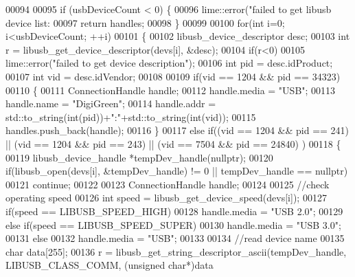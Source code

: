 \begin{DoxyCode}
{{00094 
00095     \textcolor{keywordflow}{if} (usbDeviceCount < 0) \{
00096         lime::error(\textcolor{stringliteral}{"failed to get libusb device list: %
00097         \textcolor{keywordflow}{return} handles;
00098     \}
00099 
00100     \textcolor{keywordflow}{for}(\textcolor{keywordtype}{int} i=0; i<usbDeviceCount; ++i)
00101     \{
00102         libusb\_device\_descriptor desc;
00103         \textcolor{keywordtype}{int} r = libusb\_get\_device\_descriptor(devs[i], &desc);
00104         \textcolor{keywordflow}{if}(r<0)
00105             lime::error(\textcolor{stringliteral}{"failed to get device description"});
00106         \textcolor{keywordtype}{int} pid = desc.idProduct;
00107         \textcolor{keywordtype}{int} vid = desc.idVendor;
00108 
00109         \textcolor{keywordflow}{if}(vid == 1204 && pid == 34323)
00110         \{
00111             ConnectionHandle handle;
00112             handle.media = \textcolor{stringliteral}{"USB"};
00113             handle.name = \textcolor{stringliteral}{"DigiGreen"};
00114             handle.addr = std::to\_string(\textcolor{keywordtype}{int}(pid))+\textcolor{stringliteral}{":"}+std::to\_string(\textcolor{keywordtype}{int}(vid));
00115             handles.push\_back(handle);
00116         \}
00117         \textcolor{keywordflow}{else} \textcolor{keywordflow}{if}((vid == 1204 && pid == 241) || (vid == 1204 && pid == 243) || (vid == 7504 && pid == 24840)
      )
00118         \{
00119             libusb\_device\_handle *tempDev\_handle(\textcolor{keyword}{nullptr});
00120             \textcolor{keywordflow}{if}(libusb\_open(devs[i], &tempDev\_handle) != 0 || tempDev\_handle == \textcolor{keyword}{nullptr})
00121                 \textcolor{keywordflow}{continue};
00122 
00123             ConnectionHandle handle;
00124 
00125             \textcolor{comment}{//check operating speed}
00126             \textcolor{keywordtype}{int} speed = libusb\_get\_device\_speed(devs[i]);
00127             \textcolor{keywordflow}{if}(speed == LIBUSB\_SPEED\_HIGH)
00128                 handle.media = \textcolor{stringliteral}{"USB 2.0"};
00129             \textcolor{keywordflow}{else} \textcolor{keywordflow}{if}(speed == LIBUSB\_SPEED\_SUPER)
00130                 handle.media = \textcolor{stringliteral}{"USB 3.0"};
00131             \textcolor{keywordflow}{else}
00132                 handle.media = \textcolor{stringliteral}{"USB"};
00133 
00134             \textcolor{comment}{//read device name}
00135             \textcolor{keywordtype}{char} data[255];
00136             r = libusb\_get\_string\_descriptor\_ascii(tempDev\_handle,  LIBUSB\_CLASS\_COMM, (\textcolor{keywordtype}{unsigned} \textcolor{keywordtype}{char}*)data
}}}
\end{DoxyCode}
